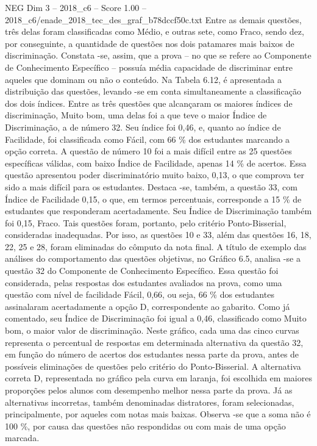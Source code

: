 \begin{textsample}{NEG Dim 3 – 2018\_c6 – Score 1.00 – 2018\_c6/enade\_2018\_tec\_des\_graf\_b78dccf50c.txt}
Entre as demais questões, três delas foram classificadas como Médio, e outras sete, como Fraco, sendo dez, por conseguinte, a quantidade de questões nos dois patamares mais baixos de discriminação.
Constata -se, assim, que a prova – no que se refere ao Componente de Conhecimento Específico – possuía média capacidade de discriminar entre aqueles que dominam ou não o conteúdo.
Na Tabela 6.12, é apresentada a distribuição das questões, levando -se em conta simultaneamente a classificação dos dois índices.
Entre as três questões que alcançaram os maiores índices de discriminação, Muito bom, uma delas foi a que teve o maior Índice de Discriminação, a de número 32.
Seu índice foi 0,46, e, quanto ao índice de Facilidade, foi classificada como Fácil, com 66 \% dos estudantes marcando a opção correta.
A questão de número 10 foi a mais difícil entre as 25 questões específicas válidas, com baixo Índice de Facilidade, apenas 14 \% de acertos.
Essa questão apresentou poder discriminatório muito baixo, 0,13, o que comprova ter sido a mais difícil para os estudantes.
Destaca -se, também, a questão 33, com Índice de Facilidade 0,15, o que, em termos percentuais, corresponde a 15 \% de estudantes que responderam acertadamente.
Seu Índice de Discriminação também foi 0,15, Fraco.
Tais questões foram, portanto, pelo critério Ponto-Bisserial, consideradas inadequadas.
Por isso, as questões 10 e 33, além das questões 16, 18, 22, 25 e 28, foram eliminadas do cômputo da nota final.
A título de exemplo das análises do comportamento das questões objetivas, no Gráfico 6.5, analisa -se a questão 32 do Componente de Conhecimento Específico.
Essa questão foi considerada, pelas respostas dos estudantes avaliados na prova, como uma questão com nível de facilidade Fácil, 0,66, ou seja, 66 \% dos estudantes assinalaram acertadamente a opção D, correspondente ao gabarito.
Como já comentado, seu Índice de Discriminação foi igual a 0,46, classificado como Muito bom, o maior valor de discriminação.
Neste gráfico, cada uma das cinco curvas representa o percentual de respostas em determinada alternativa da questão 32, em função do número de acertos dos estudantes nessa parte da prova, antes de possíveis eliminações de questões pelo critério do Ponto-Bisserial.
A alternativa correta D, representada no gráfico pela curva em laranja, foi escolhida em maiores proporções pelos alunos com desempenho melhor nessa parte da prova.
Já as alternativas incorretas, também denominadas distratores, foram selecionadas, principalmente, por aqueles com notas mais baixas.
Observa -se que a soma não é 100 \%, por causa das questões não respondidas ou com mais de uma opção marcada.

\end{textsample}
